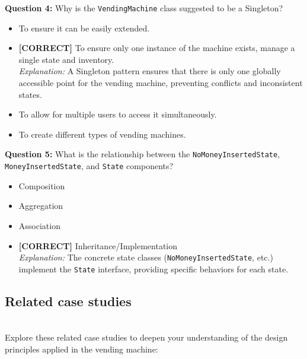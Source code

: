 \vspace{0.3cm}
\noindent
\textbf{Question 4:} Why is the \texttt{VendingMachine} class suggested to be a Singleton?
\\[0.2cm]
\begin{itemize}
 \item To ensure it can be easily extended.
 \item \textbf{[CORRECT]} To ensure only one instance of the machine exists, manage a single state and inventory.
\\[0.1cm]
\textit{Explanation:} 
A Singleton pattern ensures that there is only one globally accessible point for the vending machine, preventing conflicts and inconsistent states.
 \item To allow for multiple users to access it simultaneously.
 \item To create different types of vending machines.
\end{itemize}
\vspace{0.3cm}
\noindent
\textbf{Question 5:} What is the relationship between the \texttt{NoMoneyInsertedState}, \texttt{MoneyInsertedState}, and \texttt{State} components?
\\[0.2cm]
\begin{itemize}
 \item Composition
 \item Aggregation
 \item Association
 \item \textbf{[CORRECT]} Inheritance/Implementation
\\[0.1cm]
\textit{Explanation:} 
The concrete state classes (\texttt{NoMoneyInsertedState}, etc.) implement the \texttt{State} interface, providing specific behaviors for each state.
\end{itemize}

\subsection{Related case studies}\label{ZIbNSIhjgoR5CUcRxxV2n}
\\
Explore these related case studies to deepen your understanding of the design principles applied in the vending machine:

